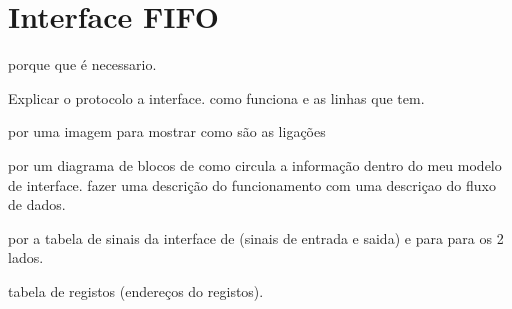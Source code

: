 
\chapter{Interface FIFO}
\label{chapter:Iter_FIFO}

porque que é necessario.

Explicar o protocolo a interface. como funciona e as linhas que tem.

por uma imagem para mostrar como s\~ao as liga\c{c}ões

por um diagrama de blocos de como circula a informa\c{c}\~ao dentro do meu modelo de interface. fazer uma descri\c{c}\~ao do funcionamento com uma descri\c{c}ao do fluxo de dados.

por a tabela de sinais da interface de (sinais de entrada e saida) e para para os 2 lados.

tabela de registos (endere\c{c}os do registos).
